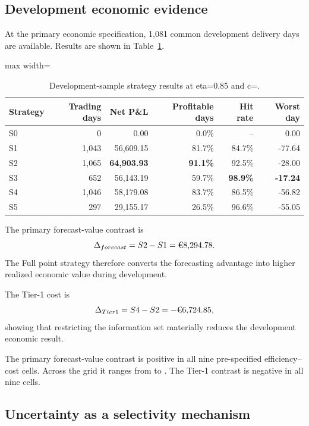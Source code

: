 \subsection{Development economic evidence}

At the primary economic specification, 1,081 common development delivery days are available. Results are shown in Table~\ref{tab:dev_strategy}.

\begin{table}[htbp]
\centering
\caption{Development-sample strategy results at eta=0.85 and c=.}
\label{tab:dev_strategy}
\begin{adjustbox}{max width=\textwidth}
\begin{tabular}{lrrrrr}
\toprule
Strategy & Trading days & Net P\&L & Profitable days & Hit rate & Worst day \\
\midrule
S0 & 0 & 0.00 & 0.0\% & -- & 0.00 \\
S1 & 1,043 & 56,609.15 & 81.7\% & 84.7\% & -77.64 \\
S2 & 1,065 & \textbf{64,903.93} & \textbf{91.1\%} & 92.5\% & -28.00 \\
S3 & 652 & 56,143.19 & 59.7\% & \textbf{98.9\%} & \textbf{-17.24} \\
S4 & 1,046 & 58,179.08 & 83.7\% & 86.5\% & -56.82 \\
S5 & 297 & 29,155.17 & 26.5\% & 96.6\% & -55.05 \\
\bottomrule
\end{tabular}
\end{adjustbox}
\end{table}

The primary forecast-value contrast is
\[
\Delta_{forecast}=S2-S1=\EUR{8,294.78}.
\]
The Full point strategy therefore converts the forecasting advantage into higher realized economic value during development.

The Tier-1 cost is
\[
\Delta_{Tier1}=S4-S2=-\EUR{6,724.85},
\]
showing that restricting the information set materially reduces the development economic result.

The primary forecast-value contrast is positive in all nine pre-specified efficiency--cost cells. Across the grid it ranges from  to . The Tier-1 contrast is negative in all nine cells.

\subsection{Uncertainty as a selectivity mechanism}

